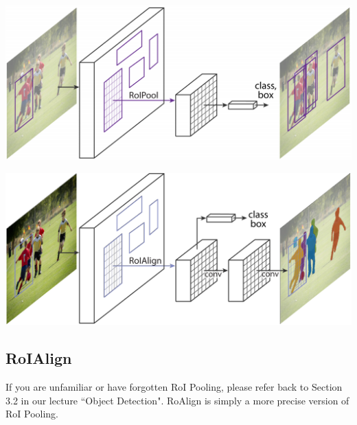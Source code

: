\begin{center}
	\includegraphics[scale=0.45]{images/fasterrcnn.PNG}
\end{center}

\begin{center}
	\includegraphics[scale=0.45]{images/maskrcnn.PNG}
\end{center}

\subsection{RoIAlign}
If you are unfamiliar or have forgotten RoI Pooling, please refer back to Section 3.2 in our lecture ``Object Detection". RoAlign is simply a more precise version of RoI Pooling. 

